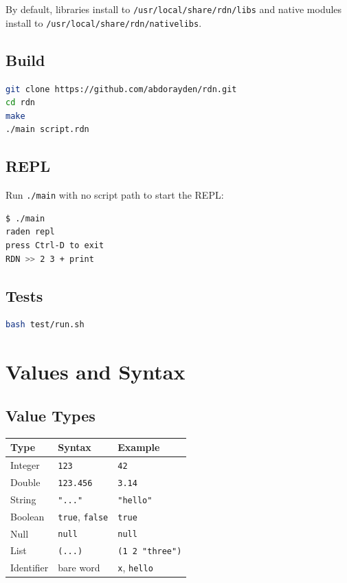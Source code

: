 \documentclass[11pt,a4paper]{article}
\newcommand{\code}[1]{\texttt{#1}}
\begin{document}
By default, libraries install to \code{/usr/local/share/rdn/libs} and
native modules install to \code{/usr/local/share/rdn/nativelibs}.

\subsection{Build}

\begin{lstlisting}[language=bash]
git clone https://github.com/abdorayden/rdn.git
cd rdn
make
./main script.rdn
\end{lstlisting}

\subsection{REPL}

Run \code{./main} with no script path to start the REPL:

\begin{lstlisting}[language=bash]
$ ./main
raden repl
press Ctrl-D to exit
RDN >> 2 3 + print
\end{lstlisting}

\subsection{Tests}

\begin{lstlisting}[language=bash]
bash test/run.sh
\end{lstlisting}

\section{Values and Syntax}

\subsection{Value Types}

\begin{longtable}{lll}
\toprule
Type & Syntax & Example \\
\midrule
Integer & \code{123} & \code{42} \\
Double & \code{123.456} & \code{3.14} \\
String & \code{"..."} & \code{"hello"} \\
Boolean & \code{true}, \code{false} & \code{true} \\
Null & \code{null} & \code{null} \\
List & \code{(...)} & \code{(1 2 "three")} \\
Identifier & bare word & \code{x}, \code{hello} \\
\bottomrule
\end{longtable}
\end{document}
